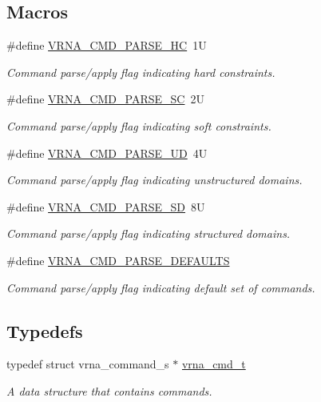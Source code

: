 \subsection*{Macros}
\begin{DoxyCompactItemize}
\item 
\#define \mbox{\hyperlink{group__command__files_gac54dec838d7b6bebd5df85f71702d324}{V\+R\+N\+A\+\_\+\+C\+M\+D\+\_\+\+P\+A\+R\+S\+E\+\_\+\+HC}}~1U
\begin{DoxyCompactList}\small\item\em Command parse/apply flag indicating hard constraints. \end{DoxyCompactList}\item 
\#define \mbox{\hyperlink{group__command__files_ga8cad3c1f83e6f149829c49a186a83e21}{V\+R\+N\+A\+\_\+\+C\+M\+D\+\_\+\+P\+A\+R\+S\+E\+\_\+\+SC}}~2U
\begin{DoxyCompactList}\small\item\em Command parse/apply flag indicating soft constraints. \end{DoxyCompactList}\item 
\#define \mbox{\hyperlink{group__command__files_ga6c6409780698826b04ebfed9151d7649}{V\+R\+N\+A\+\_\+\+C\+M\+D\+\_\+\+P\+A\+R\+S\+E\+\_\+\+UD}}~4U
\begin{DoxyCompactList}\small\item\em Command parse/apply flag indicating unstructured domains. \end{DoxyCompactList}\item 
\#define \mbox{\hyperlink{group__command__files_gaf5e20210173cdb83bf70256a454f284b}{V\+R\+N\+A\+\_\+\+C\+M\+D\+\_\+\+P\+A\+R\+S\+E\+\_\+\+SD}}~8U
\begin{DoxyCompactList}\small\item\em Command parse/apply flag indicating structured domains. \end{DoxyCompactList}\item 
\#define \mbox{\hyperlink{group__command__files_ga0a6c88e21e366dca14958d69cd024008}{V\+R\+N\+A\+\_\+\+C\+M\+D\+\_\+\+P\+A\+R\+S\+E\+\_\+\+D\+E\+F\+A\+U\+L\+TS}}
\begin{DoxyCompactList}\small\item\em Command parse/apply flag indicating default set of commands. \end{DoxyCompactList}\end{DoxyCompactItemize}
\subsection*{Typedefs}
\begin{DoxyCompactItemize}
\item 
\mbox{\label{group__command__files_gaf31afe4c5f8e4bf44a670ab4c3dcd916}} 
typedef struct vrna\+\_\+command\+\_\+s $\ast$ \mbox{\hyperlink{group__command__files_gaf31afe4c5f8e4bf44a670ab4c3dcd916}{vrna\+\_\+cmd\+\_\+t}}
\begin{DoxyCompactList}\small\item\em A data structure that contains commands. \end{DoxyCompactList}\end{DoxyCompactItemize}
